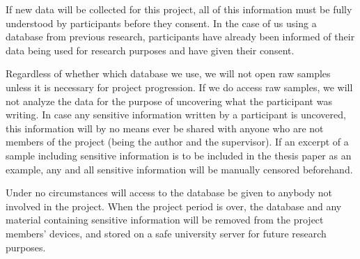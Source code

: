 \documentclass[informationsecurity]{gucmasterproject}
\begin{document}
If new data will be collected for this project, all of this information must be fully understood by participants before they consent.
In the case of us using a database from previous research, participants have already been informed of their data being used for research purposes and have given their consent.

Regardless of whether which database we use, we will not open raw samples unless it is necessary for project progression.
If we do access raw samples, we will not analyze the data for the purpose of uncovering what the participant was writing.
In case any sensitive information written by a participant is uncovered, this information will by no means ever be shared with anyone who are not members of the project (being the author and the supervisor).
If an excerpt of a sample including sensitive information is to be included in the thesis paper as an example, any and all sensitive information will be manually censored beforehand.

Under no circumstances will access to the database be given to anybody not involved in the project.
When the project period is over, the database and any material containing sensitive information will be removed from the project members' devices, and stored on a safe university server for future research purposes.


%

\end{document}
